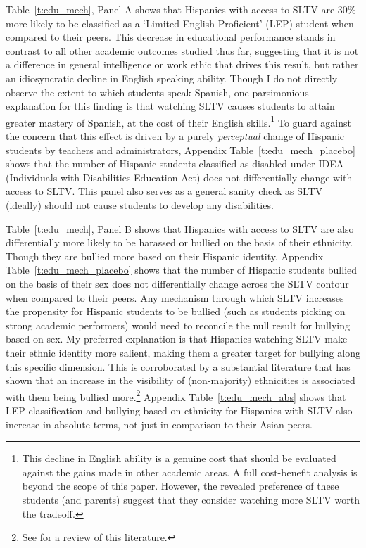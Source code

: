 \documentclass[11pt]{article}
\begin{document}
Table~\ref{t:edu_mech}, Panel A shows that Hispanics with access to SLTV are 30\% more likely to be classified as a  `Limited English Proficient' (LEP) student when compared to their peers. This decrease in educational performance stands in contrast to all other academic outcomes studied thus far, suggesting that it is not a difference in general intelligence or work ethic that drives this result, but rather an idiosyncratic decline in English speaking ability. Though I do not directly observe the extent to which students speak Spanish, one parsimonious explanation for this finding is that watching SLTV causes students to attain greater mastery of Spanish, at the cost of their English skills.\footnote{ This decline in English ability is a genuine cost that should be evaluated against the gains made in other academic areas. A full cost-benefit analysis is beyond the scope of this paper. However, the revealed preference of these students (and parents) suggest that they consider watching more SLTV worth the tradeoff.} To guard against the concern that this effect is driven by a purely \textit{perceptual} change of Hispanic students by teachers and administrators, Appendix Table~\ref{t:edu_mech_placebo} shows that the number of Hispanic students classified as disabled under IDEA (Individuals with Disabilities Education Act) does not differentially change with access to SLTV. This panel also serves as a general sanity check as SLTV (ideally) should not cause students to develop any disabilities. 

Table~\ref{t:edu_mech}, Panel B shows that Hispanics with access to SLTV are also differentially more likely to be harassed or bullied on the basis of their ethnicity. Though they are bullied more based on their Hispanic identity, Appendix Table~\ref{t:edu_mech_placebo} shows that the number of Hispanic students bullied on the basis of their sex does not differentially change across the SLTV contour when compared to their peers. Any mechanism through which SLTV increases the propensity for Hispanic students to be bullied (such as students picking on strong academic performers) would need to reconcile the null result for bullying based on sex. My preferred explanation is that Hispanics watching SLTV make their ethnic identity more salient, making them a greater target for bullying along this specific dimension. This is corroborated by a substantial literature that has shown that an increase in the visibility of (non-majority) ethnicities is associated with them being bullied more.\footnote{ See \cite{scherr_bullying_2009} for a review of this literature.} Appendix Table~\ref{t:edu_mech_abs} shows that LEP classification and bullying based on ethnicity for Hispanics with SLTV also increase in absolute terms, not just in comparison to their Asian peers. 
\end{document}
